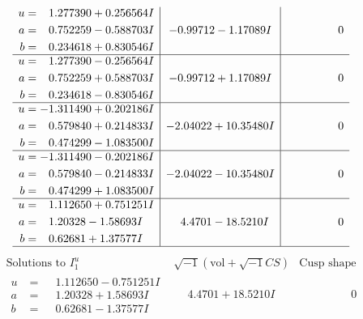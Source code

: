 \documentclass[1p]{elsarticle_modified}
\theoremstyle{definition}
\newcommand{\I}{\sqrt{-1}}
\begin{document}
$$\begin{array}{c|c|c}
\begin{aligned}
u &= \phantom{-}1.277390 + 0.256564 I \\
a &= \phantom{-}0.752259 - 0.588703 I \\
b &= \phantom{-}0.234618 + 0.830546 I\end{aligned}
 & -0.99712 - 1.17089 I & \phantom{-0.000000 } 0 \\ \hline\begin{aligned}
u &= \phantom{-}1.277390 - 0.256564 I \\
a &= \phantom{-}0.752259 + 0.588703 I \\
b &= \phantom{-}0.234618 - 0.830546 I\end{aligned}
 & -0.99712 + 1.17089 I & \phantom{-0.000000 } 0 \\ \hline\begin{aligned}
u &= -1.311490 + 0.202186 I \\
a &= \phantom{-}0.579840 + 0.214833 I \\
b &= \phantom{-}0.474299 - 1.083500 I\end{aligned}
 & -2.04022 + 10.35480 I & \phantom{-0.000000 } 0 \\ \hline\begin{aligned}
u &= -1.311490 - 0.202186 I \\
a &= \phantom{-}0.579840 - 0.214833 I \\
b &= \phantom{-}0.474299 + 1.083500 I\end{aligned}
 & -2.04022 - 10.35480 I & \phantom{-0.000000 } 0 \\ \hline\begin{aligned}
u &= \phantom{-}1.112650 + 0.751251 I \\
a &= \phantom{-}1.20328 - 1.58693 I \\
b &= \phantom{-}0.62681 + 1.37577 I\end{aligned}
 & \phantom{-}4.4701 - 18.5210 I & \phantom{-0.000000 } 0\\
 \hline 
 \end{array}$$\newpage$$\begin{array}{c|c|c}  
\text{Solutions to }I^u_{1}& \I (\text{vol} + \sqrt{-1}CS) & \text{Cusp shape}\\
 \hline 
\begin{aligned}
u &= \phantom{-}1.112650 - 0.751251 I \\
a &= \phantom{-}1.20328 + 1.58693 I \\
b &= \phantom{-}0.62681 - 1.37577 I\end{aligned}
 & \phantom{-}4.4701 + 18.5210 I & \phantom{-0.000000 } 0 \\ \hline\begin{aligned}

\end{aligned}
\end{array}$$
\end{document}
